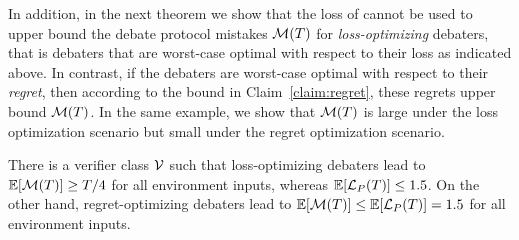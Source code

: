 \documentclass[anon]{alt2027} %
\begin{document}
In addition, in the next theorem we show that the loss of \dt cannot be used to upper bound the debate protocol mistakes ${\mathcal M}(T)$ for \emph{loss-optimizing} debaters, that is debaters that are worst-case optimal with respect to their loss as indicated above. In contrast, if the debaters are worst-case optimal with respect to their \emph{regret}, then according to the bound in Claim~\ref{claim:regret}, these regrets upper bound ${\mathcal M}(T)$. In the same example, we show that ${\mathcal M}(T)$ is large under the loss optimization scenario but small under the regret optimization scenario. 
\begin{theorem}
    There is a verifier class ${\mathcal V}$ such that loss-optimizing debaters lead to 
    $\mathbb{E}[{\mathcal M}(T)] \geq T/4$ for all environment inputs, whereas $\mathbb{E}[{{\mathcal L}_P}(T)] \leq 1.5$. On the other hand, regret-optimizing debaters lead to $\mathbb{E}[{\mathcal M}(T)] \leq \mathbb{E}[{{\mathcal L}_P}(T)] = 1.5$ for all environment inputs.
\end{theorem}
\end{document}
